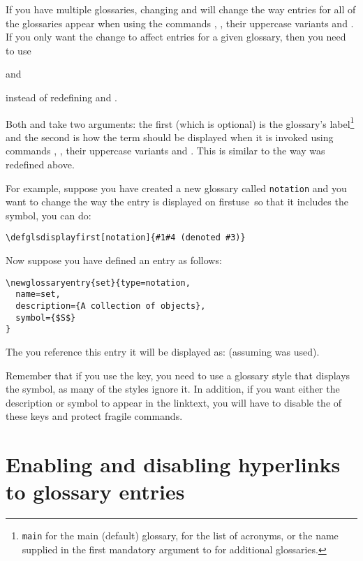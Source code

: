 \documentclass[report]{nlctdoc}
\let\glsation\glsuserii
\newcommand*{\firstuse}{\gls{firstuse}}
\newcommand*{\gloskey}[2][newglossaryentry]{\csopt{#1}{#2}}
\begin{document}
If you have multiple glossaries, changing  and
 will change the way entries for all of the
glossaries appear when using the commands , , their
uppercase variants and .  If you only
want the change to affect entries for a given glossary, then you need
to use
\begin{definition}
\end{definition}
and
\begin{definition}
\end{definition}
instead of redefining  and .

Both  and  take two arguments:
the first (which is optional) is the glossary's label\footnote{\texttt{main} for the main
(default) glossary,  for the list of acronyms, or the
name supplied in the first mandatory argument to  for
additional glossaries.} and the second is how the term should be
displayed when it is invoked using commands , 
, their uppercase variants and . This is similar to the way  was
redefined above.

For example, suppose you have created a new glossary called
\texttt{notation} and you want to change the way the entry is
displayed on \firstuse\ so that it includes the symbol, you can do:
\begin{verbatim}
\defglsdisplayfirst[notation]{#1#4 (denoted #3)}
\end{verbatim}
Now suppose you have defined an entry as follows:
\begin{verbatim}
\newglossaryentry{set}{type=notation,
  name=set,
  description={A collection of objects},
  symbol={$S$}
}
\end{verbatim}
The  you reference this entry it will be displayed as:
 (assuming  was used).

Remember that if you use the \gloskey{symbol} key, you need to use a
glossary style that displays the symbol, as many of the styles
ignore it. In addition, if you want either the description or symbol
to appear in the \gls{linktext}, you will have to disable the
\glsation{sanitize} of these keys and protect fragile
commands.

\section{Enabling and disabling hyperlinks to glossary entries}
\label{sec:disablehyperlinks}
\end{document}

